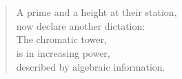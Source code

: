 
\thispagestyle{plain}

\section*{}



\vspace*{7cm}

\begin{verse}
    \hspace{8em}A prime and a height at their station, \\
    \vspace{5pt}
    \hspace{8em}now declare another dictation: \\
    \vspace{5pt}
    \hspace{8em}The chromatic tower, \\
    \vspace{5pt}
    \hspace{8em}is in increasing power, \\
    \vspace{5pt}
    \hspace{8em}described by algebraic information.

\end{verse}










